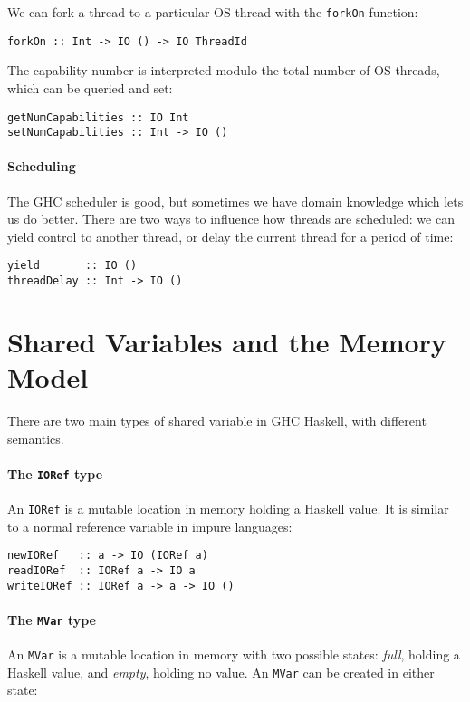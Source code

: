 We can fork a thread to a particular OS thread with the \verb|forkOn|
function:

\begin{verbatim}
forkOn :: Int -> IO () -> IO ThreadId
\end{verbatim}

The capability number is interpreted modulo the total number of OS
threads, which can be queried and set:

\begin{verbatim}
getNumCapabilities :: IO Int
setNumCapabilities :: Int -> IO ()
\end{verbatim}

\paragraph{Scheduling}
The GHC scheduler is good, but sometimes we have domain knowledge which lets us
do better.  There are two ways to influence how threads are scheduled: we can
yield control to another thread, or delay the current thread for a period of
time:

\begin{verbatim}
yield       :: IO ()
threadDelay :: Int -> IO ()
\end{verbatim}

\section{Shared Variables and the Memory Model}
\label{sec:concurrent_haskell-mmodel}

There are two main types of shared variable in GHC Haskell, with different
semantics.

\paragraph{The \texttt{IORef} type}
An \verb|IORef| is a mutable location in memory holding a Haskell
value.  It is similar to a normal reference variable in impure
languages:

\begin{verbatim}
newIORef   :: a -> IO (IORef a)
readIORef  :: IORef a -> IO a
writeIORef :: IORef a -> a -> IO ()
\end{verbatim}

\paragraph{The \texttt{MVar} type}
An \verb|MVar| is a mutable location in memory with two possible
states: \emph{full}, holding a Haskell value, and \emph{empty},
holding no value.  An \verb|MVar| can be created in either state:

